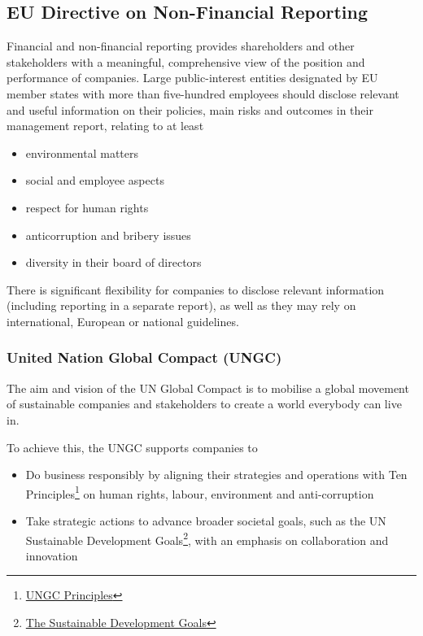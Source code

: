 \documentclass[11pt]{article}
\theoremstyle{definition}
\begin{document}
\subsection{EU Directive on Non-Financial Reporting}
Financial and non-financial reporting provides shareholders and other stakeholders with a meaningful, comprehensive view of the position and performance of companies. Large public-interest entities designated by EU member states with more than
five-hundred employees should disclose relevant and useful information on their policies, main risks and outcomes in their management report, relating to at least
\begin{itemize}
	\item environmental matters
	\item social and employee aspects
	\item respect for human rights
	\item anticorruption and bribery issues
	\item diversity in their board of directors
\end{itemize}
There is significant flexibility for companies to disclose relevant information (including reporting in a separate report), as well as they may rely on international, European or national guidelines.

\subsubsection{United Nation Global Compact (UNGC)}
The aim and vision of the UN Global Compact is to mobilise a global movement of sustainable companies and stakeholders to create a world everybody can live in.

To achieve this, the UNGC supports companies to
\begin{itemize}
	\item Do business responsibly by aligning their strategies and operations with Ten Principles\footnote{\href{https://www.unglobalcompact.org/what-is-gc/mission/principles}{UNGC Principles}} on human rights, labour, environment and anti-corruption
	\item Take strategic actions to advance broader societal goals, such as the UN Sustainable Development Goals\footnote{\href{https://www.unglobalcompact.org/what-is-gc/our-work/sustainable-development/sdgs}{The Sustainable Development Goals}}, with an emphasis on collaboration and innovation
\end{itemize}
\end{document}
